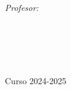 \documentclass[11pt, english, singlespacing, liststotoc, toctotoc, headsepline, chapterinoneline]{ClassThesis} %
\author{Luis Ardévol Mesa} %
\begin{document}
\frontmatter %

\pagestyle{plain} %


\begin{titlepage}
\begin{center}

\vspace*{.06\textheight}
{\scshape\LARGE \textcolor{mdtRed}{\univname}\par}\vspace{1.5cm} 
\textsc{}\\[0.5cm] 

\HRule{} \\[0.4cm]
{\huge \bfseries \ttitle\par}\vspace{0.4cm} 
\HRule{} \\[1.5cm] 
 
\begin{minipage}[t]{0.4\textwidth}
\begin{flushleft} \large
\emph{}\\
\textcolor{mdtRed}{\authorname} 
\end{flushleft}
\end{minipage}
\begin{minipage}[t]{0.4\textwidth}
\begin{flushright} \large
\emph{Profesor:} \\
\textcolor{mdtRed}{\supname} 
\end{flushright}
\end{minipage}\\[3cm]
 
\vspace{3cm}

\large \textit{\facname\\ \degreename}\\[0.8cm] 
 
\vspace{1cm}

{\large Curso 2024-2025}\\[4cm] %
 
\vfill
\end{center}
\end{titlepage}
\end{document}
